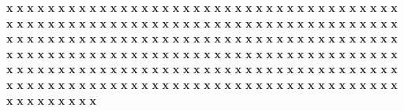 \documentclass{article}
\begin{document}
\textbf{x}
\textbf{x}
\textbf{x}
\textbf{x}
\textbf{x}
\textbf{x}
\textbf{x}
\textbf{x}
\textbf{x}
\textbf{x}
\textbf{x}
\textbf{x}
\textbf{x}
\textbf{x}
\textbf{x}
\textbf{x}
\textbf{x}
\textbf{x}
\textbf{x}
\textbf{x}
\textbf{x}
\textbf{x}
\textbf{x}
\textbf{x}
\textbf{x}
\textbf{x}
\textbf{x}
\textbf{x}
\textbf{x}
\textbf{x}
\textbf{x}
\textbf{x}
\textbf{x}
\textbf{x}
\textbf{x}
\textbf{x}
\textbf{x}
\textbf{x}
\textbf{x}
\textbf{x}
\textbf{x}
\textbf{x}
\textbf{x}
\textbf{x}
\textbf{x}
\textbf{x}
\textbf{x}
\textbf{x}
\textbf{x}
\textbf{x}
\textbf{x}
\textbf{x}
\textbf{x}
\textbf{x}
\textbf{x}
\textbf{x}
\textbf{x}
\textbf{x}
\textbf{x}
\textbf{x}
\textbf{x}
\textbf{x}
\textbf{x}
\textbf{x}
\textbf{x}
\textbf{x}
\textbf{x}
\textbf{x}
\textbf{x}
\textbf{x}
\textbf{x}
\textbf{x}
\textbf{x}
\textbf{x}
\textbf{x}
\textbf{x}
\textbf{x}
\textbf{x}
\textbf{x}
\textbf{x}
\textbf{x}
\textbf{x}
\textbf{x}
\textbf{x}
\textbf{x}
\textbf{x}
\textbf{x}
\textbf{x}
\textbf{x}
\textbf{x}
\textbf{x}
\textbf{x}
\textbf{x}
\textbf{x}
\textbf{x}
\textbf{x}
\textbf{x}
\textbf{x}
\textbf{x}
\textbf{x}
\textbf{x}
\textbf{x}
\textbf{x}
\textbf{x}
\textbf{x}
\textbf{x}
\textbf{x}
\textbf{x}
\textbf{x}
\textbf{x}
\textbf{x}
\textbf{x}
\textbf{x}
\textbf{x}
\textbf{x}
\textbf{x}
\textbf{x}
\textbf{x}
\textbf{x}
\textbf{x}
\textbf{x}
\textbf{x}
\textbf{x}
\textbf{x}
\textbf{x}
\textbf{x}
\textbf{x}
\textbf{x}
\textbf{x}
\textbf{x}
\textbf{x}
\textbf{x}
\textbf{x}
\textbf{x}
\textbf{x}
\textbf{x}
\textbf{x}
\textbf{x}
\textbf{x}
\textbf{x}
\textbf{x}
\textbf{x}
\textbf{x}
\textbf{x}
\textbf{x}
\textbf{x}
\textbf{x}
\textbf{x}
\textbf{x}
\textbf{x}
\textbf{x}
\textbf{x}
\textbf{x}
\textbf{x}
\textbf{x}
\textbf{x}
\textbf{x}
\textbf{x}
\textbf{x}
\textbf{x}
\textbf{x}
\textbf{x}
\textbf{x}
\textbf{x}
\textbf{x}
\textbf{x}
\textbf{x}
\textbf{x}
\textbf{x}
\textbf{x}
\textbf{x}
\textbf{x}
\textbf{x}
\textbf{x}
\textbf{x}
\textbf{x}
\textbf{x}
\textbf{x}
\textbf{x}
\textbf{x}
\textbf{x}
\textbf{x}
\textbf{x}
\textbf{x}
\textbf{x}
\textbf{x}
\textbf{x}
\textbf{x}
\textbf{x}
\textbf{x}
\textbf{x}
\textbf{x}
\textbf{x}
\textbf{x}
\textbf{x}
\textbf{x}
\textbf{x}
\textbf{x}
\textbf{x}
\textbf{x}
\textbf{x}
\textbf{x}
\textbf{x}
\textbf{x}
\textbf{x}
\textbf{x}
\textbf{x}
\textbf{x}
\textbf{x}
\textbf{x}
\textbf{x}
\textbf{x}
\textbf{x}
\textbf{x}
\textbf{x}
\textbf{x}
\textbf{x}
\textbf{x}
\textbf{x}
\textbf{x}
\textbf{x}
\textbf{x}
\textbf{x}
\textbf{x}
\textbf{x}
\textbf{x}
\textbf{x}
\textbf{x}
\textbf{x}
\textbf{x}
\textbf{x}
\textbf{x}
\textbf{x}
\textbf{x}
\textbf{x}
\textbf{x}
\textbf{x}
\end{document}
